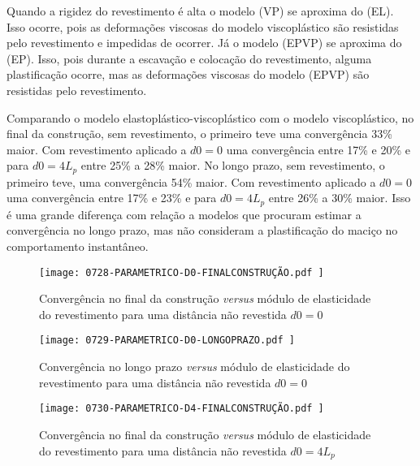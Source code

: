 Quando a rigidez do revestimento é alta o modelo (VP) se aproxima do (EL). Isso ocorre, pois as deformações viscosas do modelo viscoplástico são resistidas pelo revestimento e impedidas de ocorrer. Já o modelo (EPVP) se aproxima do (EP). Isso, pois durante a escavação e colocação do revestimento, alguma plastificação ocorre, mas as deformações viscosas do modelo (EPVP) são resistidas pelo revestimento.

Comparando o modelo elastoplástico-viscoplástico com o modelo viscoplástico, no final da construção, sem revestimento, o primeiro teve uma convergência 33\% maior. Com revestimento aplicado a $d0=0$ uma convergência entre 17\% e 20\% e para $d0=4L_p$ entre 25\% a 28\% maior. No longo prazo, sem revestimento, o primeiro teve, uma convergência 54\% maior. Com revestimento aplicado a $d0=0$ uma convergência entre 17\% e 23\% e para $d0=4L_p$ entre 26\% a 30\% maior. Isso é uma grande diferença com relação a modelos que procuram estimar a convergência no longo prazo, mas não consideram a plastificação do maciço no comportamento instantâneo.

\begin{figure}[H]
	\begin{center}
		\texttt{[image: 0728-PARAMETRICO-D0-FINALCONSTRUÇÃO.pdf
		]}
	\end{center}
	\caption{\label{PARAMETRICO-D0-FINALCONSTRUÇÃO}Convergência no final da construção \textit{versus} módulo de elasticidade do revestimento para uma distância não revestida $d0=0$}
\end{figure}

\begin{figure}[H]
	\begin{center}
		\texttt{[image: 0729-PARAMETRICO-D0-LONGOPRAZO.pdf
		]}
	\end{center}
	\caption{\label{PARAMETRICO-D0-LONGOPRAZO}Convergência no longo prazo \textit{versus} módulo de elasticidade do revestimento para uma distância não revestida $d0=0$}
\end{figure}

\begin{figure}[H]
	\begin{center}
		\texttt{[image: 0730-PARAMETRICO-D4-FINALCONSTRUÇÃO.pdf
		]}
	\end{center}
	\caption{\label{PARAMETRICO-D4-FINALCONSTRUÇÃO}Convergência no final da construção \textit{versus} módulo de elasticidade do revestimento para uma distância não revestida $d0=4L_p$}
\end{figure}

